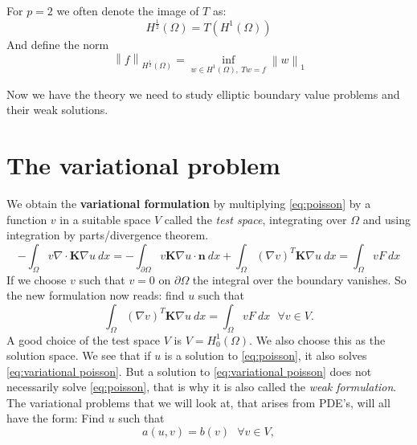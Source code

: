 \documentclass[../Main/main.tex]{subfiles}
\begin{document}
	\begin{remark}
		For $p=2$ we often denote the image of $T$ as:
		\begin{equation}
			 H^{\frac{1}{2}}(\Omega) = T(H^1(\Omega))
		\end{equation}
		And define the norm
		\begin{equation}
			\left \|f\right \|_{H^{\frac{1}{2}}(\Omega)} = \inf_{w\in H^1(\Omega), \ Tw=f} \left \| w \right \|_1
		\end{equation}
	\end{remark}
	Now we have the theory we need to study elliptic boundary value problems and their weak solutions.
	\section*{The variational problem}
	We obtain the \textbf{variational formulation} by multiplying \eqref{eq:poisson} by a function $v$ in a suitable space $V$ called the \emph{test space}, integrating over $\Omega$ and using integration by parts/divergence theorem.
	\begin{equation*}
		-\int_{\Omega}v\nabla \cdot\pmb{K}\nabla u \ dx = -\int_{\partial \Omega}v \pmb{K}\nabla u \cdot \pmb{n} \ dx + \int_{\Omega}(\nabla v)^{T}\pmb{K} \nabla u \ dx = \int_{\Omega}v F \ dx
	\end{equation*}
	If we choose $v$ such that $v=0$ on $\partial \Omega$ the integral over the boundary vanishes. So the new formulation now reads: find $u$ such that 
	\begin{equation}\label{eq:variational poisson}
			 \int_{\Omega}(\nabla v)^T \pmb{K} \nabla u \ dx = \int_{\Omega}v F \ dx \ \ \  \forall v \in V.
	\end{equation}
	A good choice of the test space $V$ is $V=H_0^1(\Omega)$. We also choose this as the solution space.
	We see that if $u$ is a solution to \eqref{eq:poisson}, it also solves \eqref{eq:variational poisson}. But a solution to \eqref{eq:variational poisson} does not necessarily solve \eqref{eq:poisson}, that is why it is also called the \emph{weak formulation}.\\
	The variational problems that we will look at, that arises from PDE's, will all have the form: Find $u$ such that
	\begin{equation}\label{eq:variational problem}
			a(u,v) = b(v) \ \ \ \forall v \in V,
	\end{equation}
\end{document}
